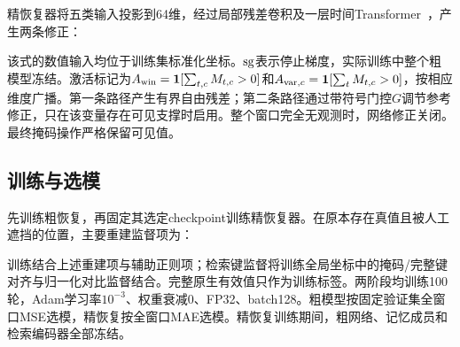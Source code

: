精恢复器将五类输入投影到64维，经过局部残差卷积及一层时间Transformer~\cite{attention}，产生两条修正：

该式的数值输入均位于训练集标准化坐标。$\operatorname{sg}$表示停止梯度，实际训练中整个粗模型冻结。激活标记为$A_{\rm win}=\mathbf{1}[\sum_{t,c}M_{t,c}>0]$和$A_{{\rm var},c}=\mathbf{1}[\sum_tM_{t,c}>0]$，按相应维度广播。第一条路径产生有界自由残差；第二条路径通过带符号门控$G$调节参考修正，只在该变量存在可见支撑时启用。整个窗口完全无观测时，网络修正关闭。最终掩码操作严格保留可见值。

\subsection{训练与选模}
先训练粗恢复，再固定其选定checkpoint训练精恢复器。在原本存在真值且被人工遮挡的位置，主要重建监督项为：

训练结合上述重建项与辅助正则项；检索键监督将训练全局坐标中的掩码/完整键对齐与归一化对比监督结合。完整原生有效值只作为训练标签。两阶段均训练100轮，Adam学习率$10^{-3}$、权重衰减0、FP32、batch128。粗模型按固定验证集全窗口MSE选模，精恢复按全窗口MAE选模。精恢复训练期间，粗网络、记忆成员和检索编码器全部冻结。
